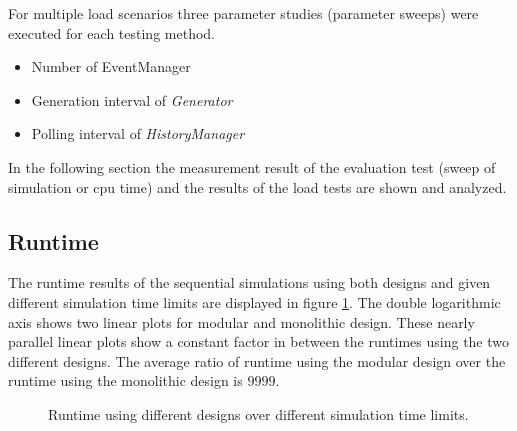 For multiple load scenarios three parameter studies (parameter sweeps) were executed for each testing method.

\begin{itemize}
    \item Number of EventManager
    \item Generation interval of \emph{Generator}
    \item Polling interval of \emph{HistoryManager}
\end{itemize}

In the following section the measurement result of the evaluation test (sweep of simulation or cpu time) and the results of the load tests are shown and analyzed.

\subsection{Runtime}
\label{sec:measurements_sequential_runtime}

The runtime results of the sequential simulations using both designs and given different simulation time limits are displayed in figure \ref{fig:results_runtime_sim_time}.
The double logarithmic axis shows two linear plots for modular and monolithic design.
These nearly parallel linear plots show a constant factor in between the runtimes using the two different designs.
The average ratio of runtime using the modular design over the runtime using the monolithic design is $9999$. %
\\


\begin{figure}
    \centering
    \caption{Runtime using different designs over different simulation time limits.}
    \label{fig:results_runtime_sim_time}
\end{figure}

